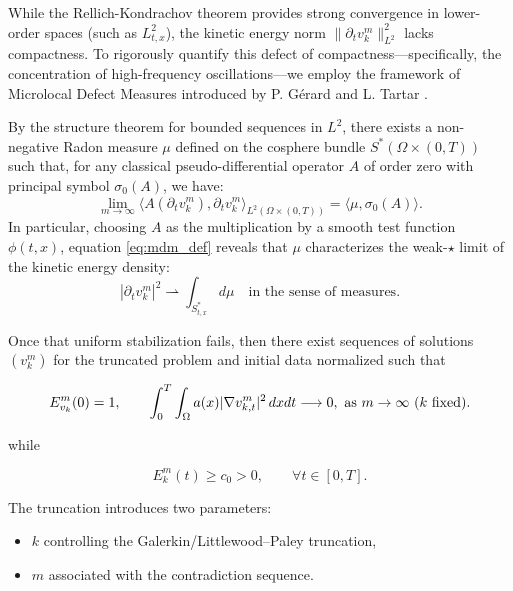 \documentclass[11pt,letterpaper]{amsart}
\begin{document}
While the Rellich-Kondrachov theorem provides strong convergence in lower-order spaces (such as $L^2_{t,x}$), the kinetic energy norm $\|\partial_t v_k^m\|_{L^2}^2$ lacks compactness. To rigorously quantify this defect of compactness---specifically, the concentration of high-frequency oscillations---we employ the framework of Microlocal Defect Measures introduced by P. Gérard \cite{Gerard} and L. Tartar \cite{Tartar}.

By the structure theorem for bounded sequences in $L^2$, there exists a non-negative Radon measure $\mu$ defined on the cosphere bundle $S^*(\Omega \times (0,T))$ such that, for any classical pseudo-differential operator $A$ of order zero with principal symbol $\sigma_0(A)$, we have:
\begin{equation}\label{eq:mdm_def}
    \lim_{m \to \infty} \langle A(\partial_t v_k^m), \partial_t v_k^m \rangle_{L^2(\Omega \times (0,T))} = \langle \mu, \sigma_0(A) \rangle.
\end{equation}
In particular, choosing $A$ as the multiplication by a smooth test function $\phi(t,x)$, equation \eqref{eq:mdm_def} reveals that $\mu$ characterizes the weak-$\star$ limit of the kinetic energy density:
\begin{equation}
    |\partial_t v_k^m|^2 \rightharpoonup \int_{S^*_{t,x}} d\mu \quad \text{in the sense of measures.}
\end{equation}

Once that uniform stabilization fails, then there exist sequences
of solutions $(v_k^m)$ for the truncated problem and initial data
normalized such that

\begin{equation}
E_{v_k}^m(0) = 1,
\qquad
\int_0^T \int_\Omega a(x) |\nabla v_{k,t}^m|^2 \, dx dt \longrightarrow 0,~ \hbox{as}~ m \rightarrow \infty ~(k ~\hbox{fixed}).
\label{stab-contr1}
\end{equation}

while

\begin{equation}
E_k^m(t) \ge c_0 > 0,
\qquad \forall t \in [0,T].
\label{stab-contr2}
\end{equation}

The truncation introduces two parameters:

\begin{itemize}
\item $k$ controlling the Galerkin/Littlewood--Paley truncation,
\item $m$ associated with the contradiction sequence.
\end{itemize}
\end{document}
